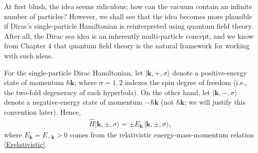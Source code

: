 \documentclass[prx,12pt]{revtex4-2}
\begin{document}
At first blush, the idea seems ridiculous; how can the vacuum contain
an infinite number of particles?  However, we shall see that the idea
becomes more plausible if Dirac's single-particle Hamiltonian is
reinterpreted using quantum field theory.  After all, the Dirac sea
idea is an inherently multi-particle concept, and we know from Chapter
4 that quantum field theory is the natural framework for working with
such ideas.

For the single-particle Dirac Hamiltonian, let $|\mathbf{k}, +,
\sigma\rangle$ denote a positive-energy state of momentum $\hbar
\mathbf{k}$, where $\sigma = 1, 2$ indexes the spin degree of freedom
(i.e., the two-fold degeneracy of each hyperbola).  On the other hand,
let $|\mathbf{k}, -, \sigma\rangle$ denote a negative-energy state of
momentum $-\hbar\mathbf{k}$ (not $\hbar\mathbf{k}$; we will justify
this convention later).  Hence,
\begin{align}
  \hat{H} |\mathbf{k}, \pm, \sigma\rangle
  = \pm E_{\mathbf{k}}\, |\mathbf{k}, \pm, \sigma\rangle,
\end{align}
where $E_{\mathbf{k}} = E_{-\mathbf{k}} > 0$ comes from the
relativistic energy-mass-momentum relation \eqref{Erelativistic}.
\end{document}
